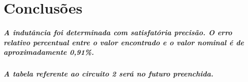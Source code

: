 \documentclass[12pt,twoside, a4paper, twocolumn]{article}
\begin{document}
\section{Conclusões}


\subparagraph*{A indutância foi determinada com satisfatória precisão. O erro relativo percentual entre o valor encontrado e o valor nominal é de aproximadamente 0,91\%.}

\subparagraph*{A tabela referente ao circuito 2 será no futuro preenchida.}
\end{document}
